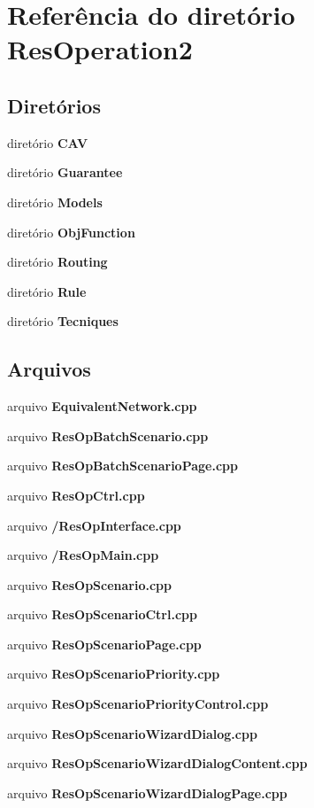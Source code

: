 \section{Referência do diretório Res\+Operation2}
\label{dir_20f2fe1f16b4961e0fbfd164b3afc9d7}
\subsection*{Diretórios}
\begin{DoxyCompactItemize}
\item 
diretório {\bf C\+AV}
\item 
diretório {\bf Guarantee}
\item 
diretório {\bf Models}
\item 
diretório {\bf Obj\+Function}
\item 
diretório {\bf Routing}
\item 
diretório {\bf Rule}
\item 
diretório {\bf Tecniques}
\end{DoxyCompactItemize}
\subsection*{Arquivos}
\begin{DoxyCompactItemize}
\item 
arquivo {\bf Equivalent\+Network.\+cpp}
\item 
arquivo {\bf Res\+Op\+Batch\+Scenario.\+cpp}
\item 
arquivo {\bf Res\+Op\+Batch\+Scenario\+Page.\+cpp}
\item 
arquivo {\bf Res\+Op\+Ctrl.\+cpp}
\item 
arquivo {\bf /\+Res\+Op\+Interface.\+cpp}
\item 
arquivo {\bf /\+Res\+Op\+Main.\+cpp}
\item 
arquivo {\bf Res\+Op\+Scenario.\+cpp}
\item 
arquivo {\bf Res\+Op\+Scenario\+Ctrl.\+cpp}
\item 
arquivo {\bf Res\+Op\+Scenario\+Page.\+cpp}
\item 
arquivo {\bf Res\+Op\+Scenario\+Priority.\+cpp}
\item 
arquivo {\bf Res\+Op\+Scenario\+Priority\+Control.\+cpp}
\item 
arquivo {\bf Res\+Op\+Scenario\+Wizard\+Dialog.\+cpp}
\item 
arquivo {\bf Res\+Op\+Scenario\+Wizard\+Dialog\+Content.\+cpp}
\item 
arquivo {\bf Res\+Op\+Scenario\+Wizard\+Dialog\+Page.\+cpp}
\end{DoxyCompactItemize}
